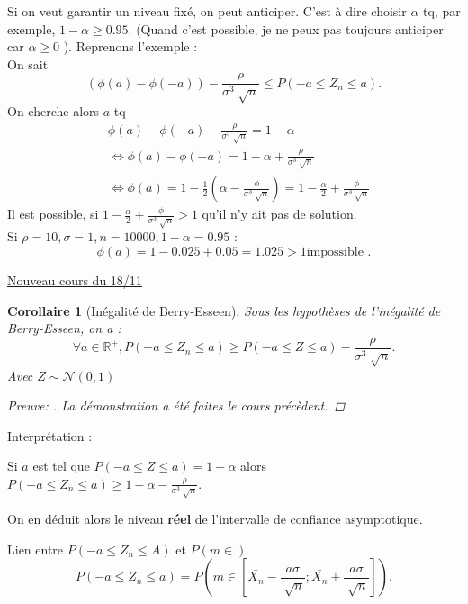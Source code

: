 \documentclass{article}
\theoremstyle{plain}%
\newtheorem*{cor}{Corollaire}
\theoremstyle{definition}
\theoremstyle{remark}
\begin{document}
Si on veut garantir un niveau fixé, on peut anticiper. C'est à dire choisir $ \alpha  $ tq, par exemple, $ 1- \alpha \geq 0.95$. (Quand c'est possible, je ne peux pas toujours anticiper car $ \alpha \geq 0 $ ). 
Reprenons l'exemple : \\
On sait 
\[
    (\phi (a) - \phi (-a)) - \frac{\rho }{\sigma ^3 \sqrt[]{n}} \leq P(-a \leq Z_n \leq a)
.\]
On cherche alors $ a $ tq 
\begin{align*}
    &\phi (a) - \phi (-a) - \frac{\rho }{\sigma ^3 \sqrt[]{n}} = 1 - \alpha  \\
    & \Leftrightarrow \phi (a) - \phi (-a) = 1 - \alpha + \frac{\rho }{\sigma ^3 \sqrt[]{n}}\\
    & \Leftrightarrow \phi (a) = 1 - \frac{1}{2}(\alpha - \frac{\phi }{\sigma ^3 \sqrt[]{n}}) = 1 - \frac{\alpha }{2} + \frac{\phi }{\sigma ^3 \sqrt[]{n}}
\end{align*} 
Il est possible, si $ 1 - \frac{\alpha }{2} + \frac{\phi }{\sigma ^3 \sqrt[]{n}} > 1$ qu'il n'y ait pas de solution. \\
Si $ \rho = 10, \sigma =1, n = 10 000, 1-\alpha = 0.95 $ : 
\[
    \phi (a) = 1 - 0.025 + 0.05 = 1.025 > 1 \text{impossible }
.\]

\underline{Nouveau cours du 18/11} \\

\begin{cor}[Inégalité de Berry-Esseen]
    Sous les hypothèses de l'inégalité de Berry-Esseen, on a : 
    \[
        \forall a \in \mathbb{R}^+, P(-a \leq Z_n \leq a) \geq P(-a \leq Z \leq a) - \frac{\rho }{\sigma ^3 \sqrt[]{n}}
    .\]
    Avec $ Z \sim \mathcal{N}(0,1) $ 

    \begin{proof}[Preuve: ]
        La démonstration a été faites le cours précèdent.
    \end{proof}
    
    
\end{cor}
Interprétation : 

Si $ a $ est tel que $ P(-a \leq Z \leq a) = 1 - \alpha $  alors $ P(-a \leq Z_n \leq a) \geq 1 - \alpha - \frac{\rho }{\sigma ^3 \sqrt[]{n}} $. 

On en déduit alors le niveau \textbf{réel} de l'intervalle de confiance asymptotique. 

Lien entre $ P(-a \leq Z_n \leq A) $ et $ P(m \in ) $ 
\[
    P(-a \leq Z_n \leq a) = P(m \in [\bar{X_n} - \frac{a \sigma }{\sqrt[]{n}} ; \bar{X_n} + \frac{a \sigma }{\sqrt[]{n}}])
.\]
\end{document}
